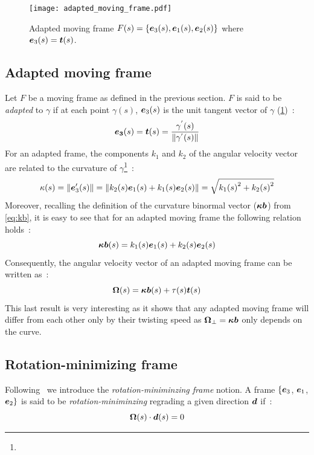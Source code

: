 \begin{figure}[t]
\centering
\texttt{[image: adapted\_moving\_frame.pdf]}
\caption{Adapted moving frame $F(s) =\{\boldsymbol{e}_{3}(s),\boldsymbol{e}_{1}(s),\boldsymbol{e}_{2}(s)\}$ where $\boldsymbol{e}_3(s) = \boldsymbol{t}(s)$.}
\label{fig:adapted}
\end{figure}

\subsection{Adapted moving frame}
\label{sec:amf}
Let $F$ be a moving frame as defined in the previous section. $F$ is said to be \emph{adapted} to $\gamma$ if at each point $\gamma(s)$, $\boldsymbol{e}_{3}(s)$ is the unit tangent vector of $\gamma$ (\cref{fig:adapted})~:
\begin{equation}
	\boldsymbol{e_{3}}(s) = \boldsymbol{t}(s) = \frac{\gamma^{'}(s)}{\lVert\gamma^{'}(s)\rVert}
\end{equation}
For an adapted frame, the components $k_1$ and $k_2$ of the angular velocity vector are related to the curvature of $\gamma$\footnote{}~: 
\begin{equation}
	\kappa(s) = \lVert\boldsymbol{e}'_{3}(s)\rVert = \lVert k_2(s)\boldsymbol{e}_1(s) + k_1(s)\boldsymbol{e}_2(s)\rVert = \sqrt{{k_{1}(s)}^2 + {k_{2}(s)}^2}
\end{equation}
Moreover, recalling the definition of the curvature binormal vector ($\boldsymbol{\kappa b}$) from \cref{eq:kb}, it is easy to see that for an adapted moving frame the following relation holds~:
 \begin{equation}
	\boldsymbol{\kappa b}(s) = k_1(s) \boldsymbol{e}_1(s) +  k_2(s) \boldsymbol{e}_2(s) \label{eq:amf_kb}
\end{equation}
Consequently, the angular velocity vector of an adapted moving frame can be written as~:
 \begin{equation}
	\boldsymbol{\Omega}(s) = \boldsymbol{\kappa b}(s)  + \tau(s) \boldsymbol{t}(s)
\end{equation}
This last result is very interesting as it shows that any adapted moving frame will differ from each other only by their twisting speed as $\boldsymbol{\Omega}_{\perp} =  \boldsymbol{\kappa b}$ only depends on the curve.

\subsection{Rotation-minimizing frame}
Following~\cite{Farouki2014, Wang2008} we introduce the \emph{rotation-miniminzing frame} notion. A frame $\{\boldsymbol{e}_{3}$, $\boldsymbol{e}_{1}$, $\boldsymbol{e}_{2}\}$ is said to be \emph{rotation-miniminzing} regrading a given direction $\boldsymbol{d}$ if~:
\begin{equation}
	\boldsymbol{\Omega}(s) \cdot \boldsymbol{d}(s) = 0
\end{equation}

